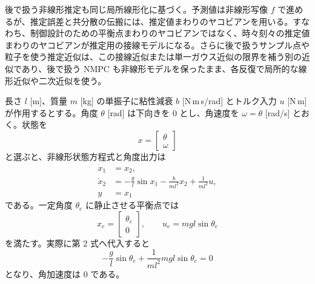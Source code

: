 後で扱う非線形推定も同じ局所線形化に基づく。予測値は非線形写像 $f$ で進めるが、推定誤差と共分散の伝搬には、推定値まわりのヤコビアンを用いる。すなわち、制御設計のための平衡点まわりのヤコビアンではなく、時々刻々の推定値まわりのヤコビアンが推定用の接線モデルになる。さらに後で扱うサンプル点や粒子を使う推定近似は、この接線近似または単一ガウス近似の限界を補う別の近似であり、後で扱う NMPC も非線形モデルを保ったまま、各反復で局所的な線形近似や二次近似を使う。

\begin{example}[トルク入力をもつ単振子の局所線形化]
長さ $l$ [m]、質量 $m$ [kg] の単振子に粘性減衰 $b$ [N\,m\,s/rad] とトルク入力 $u$ [N\,m] が作用するとする。角度 $\theta$ [rad] は下向きを $0$ とし、角速度を $\omega=\dot{\theta}$ [rad/s] とおく。状態を
\begin{equation}
  x=\begin{bmatrix}\theta\\ \omega\end{bmatrix}
\end{equation}
と選ぶと、非線形状態方程式と角度出力は
\begin{align}
  \dot{x}_1&=x_2,\\
  \dot{x}_2&=-\frac{g}{l}\sin x_1-\frac{b}{ml^2}x_2+\frac{1}{ml^2}u,\\
  y&=x_1
\end{align}
である。一定角度 $\theta_e$ に静止させる平衡点では
\begin{equation}
  x_e=
  \begin{bmatrix}\theta_e\\0\end{bmatrix},
  \qquad
  u_e=mgl\sin\theta_e
\end{equation}
を満たす。実際に第 2 式へ代入すると
\begin{equation}
  -\frac{g}{l}\sin\theta_e
  +\frac{1}{ml^2}mgl\sin\theta_e
  =0
\end{equation}
となり、角加速度は 0 である。


\end{example}
